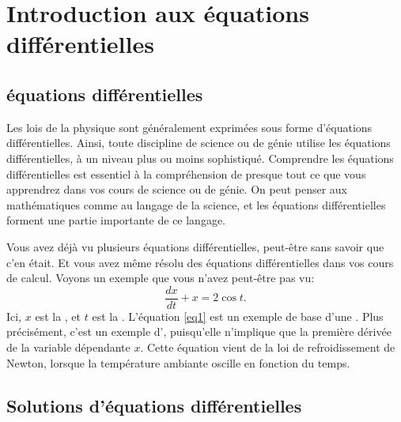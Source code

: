 
\sectionnewpage
\section{Introduction aux équations différentielles}
\label{introde:section}


\subsection{équations différentielles}

Les lois de la physique sont généralement exprimées sous forme d'équations différentielles.  Ainsi, toute discipline de science ou de génie utilise les équations différentielles, à un niveau plus ou moins sophistiqué.  Comprendre les équations différentielles est essentiel à la compréhension de presque tout ce que vous apprendrez dans vos cours de science ou de génie.  On peut penser aux mathématiques comme au langage de la science, et les équations différentielles forment une partie importante de ce langage.

Vous avez déjà vu plusieurs équations différentielles, peut-être sans savoir que c'en était.
Et vous avez même résolu des équations différentielles dans vos cours de calcul.  Voyons un exemple que vous n'avez peut-être pas vu:
\begin{equation} \label{eq1}
\frac{dx}{dt} + x = 2 \cos t .
\end{equation}
Ici, $x$ est la  \emph{}, et $t$ est la \emph{}.
L'équation \eqref{eq1}
est un exemple de base d'une \emph{}. Plus précisément, c'est un exemple d'\emph{}, puisqu'elle n'implique que la première dérivée de la variable dépendante $x$.  Cette équation vient de la loi de refroidissement de Newton, lorsque la température ambiante oscille en fonction du temps.

\subsection{Solutions d'équations différentielles}

